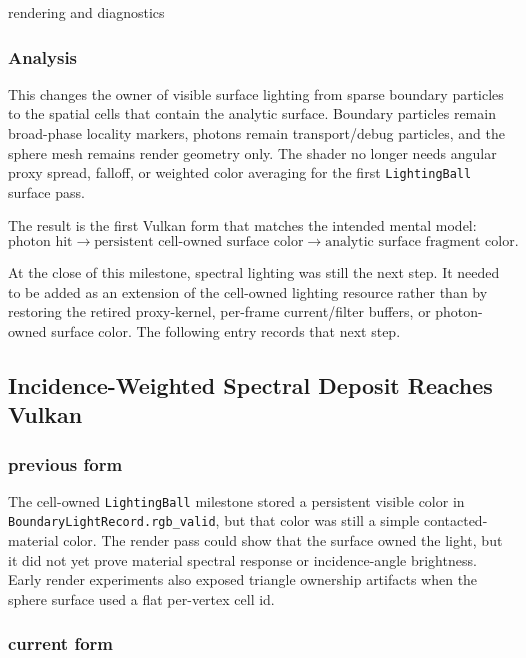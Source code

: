 rendering and diagnostics

\subsubsection{Analysis}

This changes the owner of visible surface lighting from sparse boundary
particles to the spatial cells that contain the analytic surface.  Boundary
particles remain broad-phase locality markers, photons remain transport/debug
particles, and the sphere mesh remains render geometry only.  The shader no
longer needs angular proxy spread, falloff, or weighted color averaging for
the first \texttt{LightingBall} surface pass.

The result is the first Vulkan form that matches the intended mental model:
\[
    \textrm{photon hit}
    \rightarrow
    \textrm{persistent cell-owned surface color}
    \rightarrow
    \textrm{analytic surface fragment color}.
\]

At the close of this milestone, spectral lighting was still the next step.  It
needed to be added as an extension of the cell-owned lighting resource rather
than by restoring the retired proxy-kernel, per-frame current/filter buffers,
or photon-owned surface color.  The following entry records that next step.

\subsection{Incidence-Weighted Spectral Deposit Reaches Vulkan}

\subsubsection{previous form}

The cell-owned \texttt{LightingBall} milestone stored a persistent visible
color in \texttt{BoundaryLightRecord.rgb\_valid}, but that color was still a
simple contacted-material color.  The render pass could show that the surface
owned the light, but it did not yet prove material spectral response or
incidence-angle brightness.  Early render experiments also exposed triangle
ownership artifacts when the sphere surface used a flat per-vertex cell id.

\subsubsection{current form}

